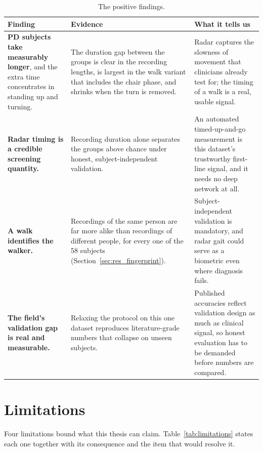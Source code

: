 \begin{table}[H]
  \centering
  \caption[The positive findings]{The positive findings.}
  \label{tab:positive}
  \small
  \begin{tabular}{@{}L{3.6cm}L{5.1cm}L{5.4cm}@{}}
    \toprule
    \textbf{Finding} & \textbf{Evidence} & \textbf{What it tells us} \\
    \midrule
    \textbf{PD subjects take measurably longer}, and the extra time
    concentrates in standing up and turning. &
    The duration gap between the groups is clear in the recording lengths,
    is largest in the walk variant that includes the chair phase, and
    shrinks when the turn is removed. &
    Radar captures the slowness of movement that clinicians already test
    for; the timing of a walk is a real, usable signal. \\
    \addlinespace
    \textbf{Radar timing is a credible screening quantity.} &
    Recording duration alone separates the groups above chance under honest,
    subject-independent validation. &
    An automated timed-up-and-go measurement is this dataset's trustworthy
    first-line signal, and it needs no deep network at all. \\
    \addlinespace
    \textbf{A walk identifies the walker.} &
    Recordings of the same person are far more alike than recordings of
    different people, for every one of the 58 subjects
    (Section~\ref{sec:res_fingerprint}). &
    Subject-independent validation is mandatory, and radar gait could serve
    as a biometric even where diagnosis fails. \\
    \addlinespace
    \textbf{The field's validation gap is real and measurable.} &
    Relaxing the protocol on this one dataset reproduces literature-grade
    numbers that collapse on unseen subjects. &
    Published accuracies reflect validation design as much as clinical
    signal, so honest evaluation has to be demanded before numbers are
    compared. \\
    \bottomrule
  \end{tabular}
\end{table}

\section{Limitations}
\label{sec:limitations}

Four limitations bound what this thesis can claim.
Table~\ref{tab:limitations} states each one together with its consequence
and the item that would resolve it.

